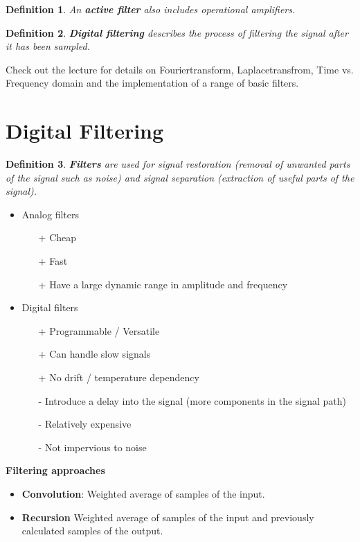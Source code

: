 \documentclass[10pt,a4paper]{scrartcl}
\newtheorem{define}{Definition}
\begin{document}
\begin{multicols*}{2}
\begin{define}
An \textbf{active filter} also includes operational amplifiers.
\end{define}

\begin{define}
\textbf{Digital filtering} describes the process of filtering the signal after it has been sampled.
\end{define}

Check out the lecture for details on Fouriertransform, Laplacetransfrom, Time vs. Frequency domain and the implementation of a range of basic filters.

\section{Digital Filtering}

\begin{define}
\textbf{Filters} are used for signal restoration (removal of unwanted parts of the signal such as noise) and signal separation (extraction of useful parts of the signal).
\end{define}

\begin{itemize}
\item Analog filters
\begin{itemize}
\item[+] Cheap
\item[+] Fast
\item[+] Have a large dynamic range in amplitude and frequency
\end{itemize}
\item Digital filters
\begin{itemize}
\item[+] Programmable / Versatile
\item[+] Can handle slow signals
\item[+] No drift / temperature dependency
\item[-] Introduce a delay into the signal (more components in the signal path)
\item[-] Relatively expensive
\item[-] Not impervious to noise
\end{itemize}
\end{itemize}

\textbf{Filtering approaches}
\begin{itemize}
\item \textbf{Convolution}: Weighted average of samples of the input. 
\item \textbf{Recursion} Weighted average of samples of the input and previously calculated samples of the output.
\end{itemize}


\end{multicols*}
\end{document}

